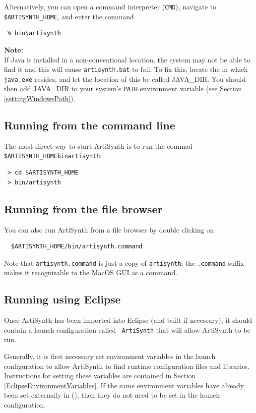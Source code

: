 Alternatively, you can open a command interpreter ({\tt CMD}), navigate
to {\tt \$ARTISYNTH\_HOME}, and enter the command

\begin{verbatim}
 % bin\artisynth
\end{verbatim}

\begin{sideblock}
{\bf Note:}\\
If Java is installed in a non-conventional location, the system may
not be able to find it and this will cause {\tt artisynth.bat} to fail.
To fix this, locate the \directory in which {\tt java.exe} resides, and let
the location of this \directory be called JAVA\_DIR. You should then add
JAVA\_DIR to your system's {\tt PATH} environment variable (see
Section \ref{settingWindowsPath}).  
\end{sideblock}
\else
\subsection{Running from the command line}
\label{artisynthCommandLine}

The most direct way to start ArtiSynth is to run the commad
{\tt \$ARTISYNTH\_HOME\SEP bin\SEP artisynth}:

\begin{verbatim}
 > cd $ARTISYNTH_HOME
 > bin/artisynth
\end{verbatim}
\ifMacOS
\subsection{Running from the file browser}

You can also run ArtiSynth from a file browser by double clicking on
\begin{verbatim}
  $ARTISYNTH_HOME/bin/artisynth.command
\end{verbatim}
Note that {\tt artisynth.command} is just a copy of {\tt artisynth};
the {\tt .command} suffix makes it recognizable to the MacOS GUI as a
command.
\fi\fi

\subsection{Running using Eclipse}

Once ArtiSynth has been imported into Eclipse (and built if
necessary), it should contain a launch configuration called {\tt
ArtiSynth} that will allow ArtiSynth to be run.

Generally, it is first necessary set environment variables in the
launch configuration to allow ArtiSynth to find runtime configuration
files and libraries. Instructions for setting these variables are
contained in Section \ref{EclipseEnvironmentVariables}.  If the same
environment variables have already been set externally in \SYSTEM
(\environmentSectionRef),
then they do not need to be set in the launch configuration.


